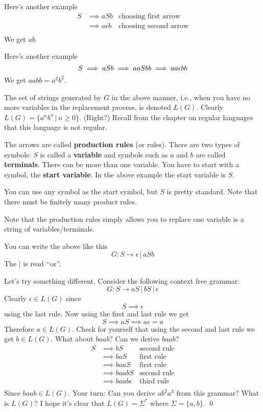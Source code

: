 Here's another example
\begin{align*}
S 
&\implies aSb & \text{choosing first arrow}\\
&\implies a\epsilon b & \text{choosing second arrow} \\
\end{align*}
We get $ab$.

Here's another example
\[
S 
\implies aSb \\
\implies aaSbb \\
\implies aa\epsilon bb
\]
We get $aabb = a^2 b^2$.

The set of strings generated by $G$ in the above manner, i.e., 
when you have no more variables in the replacement process, is denoted $L(G)$.
Clearly $L(G) = \{a^n b^n \,|\, n \geq 0\}$.
(Right?)
Recall from the chapter on regular languages that this language is not regular.

The arrows are called \textbf{production rules} (or rules).
There are two types of symbols: $S$ is called a \textbf{variable} and symbols 
such as $a$ and $b$ are called \textbf{terminals}.
There can be more than one variable.
You have to start with a symbol,  the \textbf{start variable}. 
In the above example the start variable is $S$.

You can use any symbol as the start symbol, but $S$ is pretty standard.
Note that there must be finitely many product rules.

Note that the production rules simply allows you to replace one
variable is a string of variables/terminals.

You can write the above like this
\[
G: S \rightarrow \epsilon \,|\, aSb
\]
The $|$ is read \lq\lq or''.

\begin{eg}
Let's try something different.
Consider the following context free grammar:
\[
G : S \rightarrow aS \,|\, bS \,|\, \epsilon
\]
Clearly $\epsilon \in L(G)$ since
\[
S \implies \epsilon
\]
using the last rule. Now using the first and last rule we get
\[
S 
\implies aS 
\implies a\epsilon = a
\]
Therefore $a \in L(G)$. 
Check for yourself that using the second and last rule we get $b \in L(G)$.
What about $baab$? Can we derive $baab$?
\begin{align*}
S 
&\implies bS &\text{second rule} \\
&\implies baS &\text{first rule} \\
&\implies baaS &\text{first rule} \\
&\implies baabS &\text{second rule} \\
&\implies baab\epsilon &\text{third rule} \\
\end{align*}
Since $baab \in L(G)$. 
Your turn: Can you derive $ab^2 a^3$ from this grammar?
What is $L(G)$?
I hope it's clear that $L(G) = \Sigma^*$ where $\Sigma = \{a, b\}$.
\qed
\end{eg}

